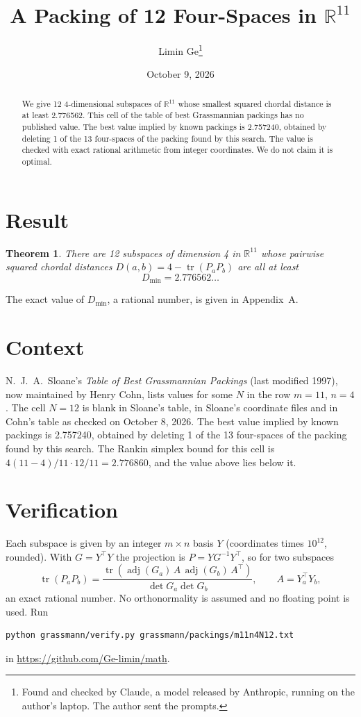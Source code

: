 \documentclass[11pt,a4paper]{article}
\title{A Packing of 12 Four-Spaces in $\mathbb{R}^{11}$}
\author{Limin Ge\thanks{Found and checked by Claude, a model released by Anthropic, running on the author's laptop. The author sent the prompts.}}
\date{October 9, 2026}
\newtheorem*{theorem}{Theorem}
\begin{document}
\maketitle
\begin{abstract}
We give 12 4-dimensional subspaces of $\mathbb{R}^{11}$ whose smallest squared chordal distance is at least 2.776562. This cell of the table of best Grassmannian packings has no published value. The best value implied by known packings is 2.757240, obtained by deleting 1 of the 13 four-spaces of the packing found by this search. The value is checked with exact rational arithmetic from integer coordinates. We do not claim it is optimal.
\end{abstract}

\section{Result}
\begin{theorem}
There are 12 subspaces of dimension 4 in $\mathbb{R}^{11}$ whose pairwise squared chordal distances $D(a,b) = 4 - \operatorname{tr}(P_aP_b)$ are all at least
\[ D_{\min} = 2.776562\ldots \]
\end{theorem}
The exact value of $D_{\min}$, a rational number, is given in Appendix~A.


\section{Context}
N.~J.~A.~Sloane's \emph{Table of Best Grassmannian Packings} (last modified 1997), now maintained by Henry Cohn, lists values for some $N$ in the row $m=11$, $n=4$. The cell $N=12$ is blank in Sloane's table, in Sloane's coordinate files and in Cohn's table as checked on October 8, 2026. The best value implied by known packings is 2.757240, obtained by deleting 1 of the 13 four-spaces of the packing found by this search. The Rankin simplex bound for this cell is $4(11-4)/11\cdot 12/11 = 2.776860$, and the value above lies below it.


\section{Verification}
Each subspace is given by an integer $m\times n$ basis $Y$ (coordinates times $10^{12}$, rounded). With $G=Y^\top Y$ the projection is $P=YG^{-1}Y^\top$, so for two subspaces
\[ \operatorname{tr}(P_aP_b)=\frac{\operatorname{tr}(\operatorname{adj}(G_a)\,A\,\operatorname{adj}(G_b)\,A^\top)}{\det G_a\det G_b},\qquad A=Y_a^\top Y_b, \]
an exact rational number. No orthonormality is assumed and no floating point is used. Run
\begin{verbatim}
python grassmann/verify.py grassmann/packings/m11n4N12.txt
\end{verbatim}
in \url{https://github.com/Ge-limin/math}.
\end{document}
